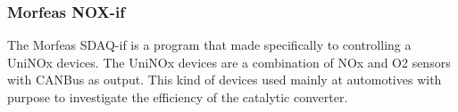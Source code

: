 \subsubsection{Morfeas NOX-if}
The Morfeas SDAQ-if is a program that made specifically to controlling a UniNOx devices.
The UniNOx devices are a combination of NOx and O2 sensors with CANBus as output.
This kind of devices used mainly at automotives with purpose to investigate the efficiency of the catalytic converter.
